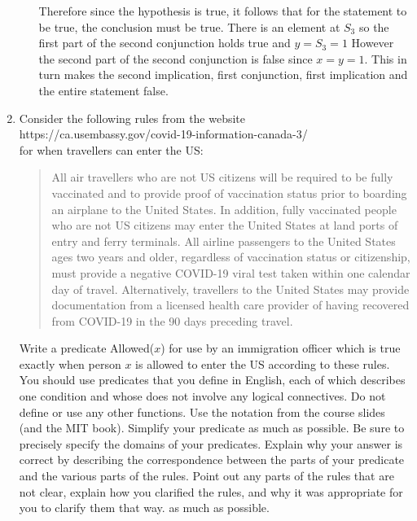 \documentclass[11pt]{article}
\begin{document}
\begin{enumerate}
\begin{enumerate}
\begin{solution}
Therefore since the hypothesis is true, it follows that for the statement to be true, the conclusion must be true.
There is an element at $S_3$ so the first part of the second conjunction holds true and $y=S_3=1$
However the second part of the second conjunction is false since $x=y=1$. This in turn makes the second implication, first conjunction, first implication and the entire statement false.
\end{solution}
\end{enumerate}
\item
\begin{question}
Consider the following rules from the website\\
https://ca.usembassy.gov/covid-19-information-canada-3/\\
for when travellers can enter the US:
\begin{quotation}
All air travellers who are not US citizens will be required to be fully vaccinated
and to provide proof of vaccination status prior to boarding an airplane to the
United States.  In addition, fully vaccinated people who are not US citizens may
enter the United States at land ports of entry and ferry terminals.
All airline passengers to the United States ages two years and older, regardless of
vaccination status or citizenship, must provide a negative COVID-19 viral test
taken within one calendar day of travel. Alternatively, travellers to the United
States may provide documentation from a licensed health care provider of having
recovered from COVID-19 in the 90 days preceding travel.
\end{quotation}
Write a predicate Allowed($x$) for use by an immigration officer which is true
exactly when person $x$ is allowed to enter the US according to these rules.
You  should use
predicates that you define in English, each of which describes one condition and
whose does not involve any logical connectives. Do not define or use any other
functions.
Use the notation from the course slides (and the MIT book). Simplify your predicate
as much as possible.
Be sure to precisely specify the domains of your predicates.
Explain why your answer is correct by describing the correspondence between the
parts of your predicate and the various parts of the rules.
Point out any parts of the rules that are not clear, explain how you clarified the
rules, and why it was appropriate for you to
clarify them that way.
as much as possible.
\end{question}
\begin{solution}


\end{solution}
\end{enumerate}
\end{document}
